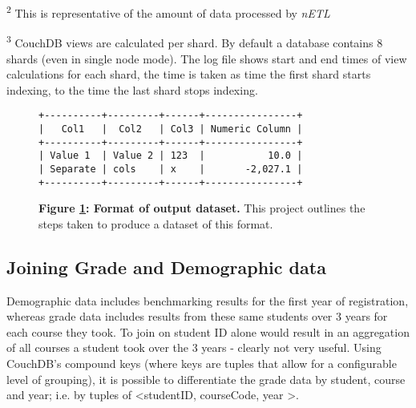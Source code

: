 \begin{table}[h]
\begin{threeparttable}
\begin{tablenotes}
            \item[\textsuperscript{2}]This is representative of the amount of data processed by \textit{nETL}
            \item[\textsuperscript{3}]CouchDB views are calculated per shard. By default a database contains 8 shards (even in single node mode). The log file shows start and end times of view calculations for each shard, the time is taken as time the first shard starts indexing, to the time the last shard stops indexing.
        \end{tablenotes}
    \end{threeparttable}
\end{table}


\begin{figure}[ht]
    \centering
    \begin{verbatim}
+----------+---------+------+----------------+
|   Col1   |  Col2   | Col3 | Numeric Column |
+----------+---------+------+----------------+
| Value 1  | Value 2 | 123  |           10.0 |
| Separate | cols    | x    |       -2,027.1 |
+----------+---------+------+----------------+
    \end{verbatim}
    \caption[Analysis dataset output format]{\textbf{Figure \ref{dataset-output}: Format of output dataset.} This project outlines the steps taken to produce a dataset of this format.}
    \label{dataset-output}
\end{figure}

\subsection{Joining Grade and Demographic data}
Demographic data includes benchmarking results for the first year of registration, whereas grade data includes results from these same students over 3 years for each course they took. To join on student ID alone would result in an aggregation of all courses a student took over the 3 years - clearly not very useful. Using CouchDB's compound keys (where keys are tuples that allow for a configurable level of grouping), it is possible to differentiate the grade data by student, course and year; i.e. by tuples of \textless studentID, courseCode, year \textgreater.

